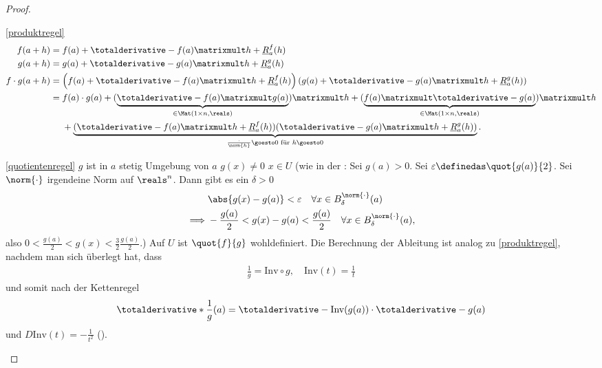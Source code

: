 \begin{proof}
    \begin{proofdescription}
        \item[\ref{produktregel}]
        \begin{align*}
            f(a+h)&=f(a)+\totalderivative-{f}(a)\matrixmult h+\underline{R}_{a}^f(h)\\
            g(a+h)&=g(a)+\totalderivative-{g}(a)\matrixmult h+\underline{R}_{a}^g(h)\\
            f\cdot g(a+h)&\begin{aligned}[t]
                &=\left( f(a)+\totalderivative-{f}(a)\matrixmult h+\underline{R}_{a}^f(h) \right)\left( g(a)+\totalderivative-{g}(a)\matrixmult h+\underline{R}_{a}^g(h) \right)\\
                &=\begin{aligned}[t]
                    &f(a)\cdot g(a)+(\underbrace{\totalderivative-{f}(a)\matrixmult g(a)}_{\in \Mat(1\times n,\reals)})\matrixmult h+(\underbrace{f(a)\matrixmult \totalderivative-{g}(a)}_{\in \Mat(1\times n,\reals)})\matrixmult h\\
                    &+\underbrace{(\totalderivative-{f}(a)\matrixmult h+\underline{R}_a^f(h))(\totalderivative-{g}(a)\matrixmult h+\underline{R}_a^g(h))}_{\frac{\cdot}{\norm{h}}\goesto 0 \text{ für }h\goesto 0}.
                \end{aligned}
            \end{aligned}            
        \end{align*}
        \item[\ref{quotientenregel}] \( g \) ist in \( a \) stetig \timplies \texists Umgebung von \( a \) \sd \( g(x)\neq 0 \) \tforall \( x\in U \) (wie in der : Sei \obda \( g(a)>0 \). Sei \( \varepsilon\definedas \quot{g(a)}{2} \). Sei \( \norm{\cdot} \) irgendeine Norm auf \( \reals^n \). Dann gibt es ein \( \delta>0 \) \sd
        \begin{align*}
            &\abs{g(x)-g(a)}<\varepsilon\quad \forall x\in B_{\delta}^{\norm{\cdot}}(a)\\
            \implies &-\frac{g(a)}{2}<g(x)-g(a)<\frac{g(a)}{2}\quad \forall x\in B_{\delta}^{\norm{\cdot}}(a),
        \end{align*}
        also \( 0<\frac{g(a)}{2}<g(x)<\frac{3}{2}\frac{g(a)}{2} \).) \timplies Auf \( U \) ist \( \quot{f}{g} \) wohldefiniert. Die Berechnung der Ableitung ist analog zu \ref{produktregel}, nachdem man sich überlegt hat, dass
        \begin{align*}
            \frac{1}{g}=\text{Inv}\circ g,\quad \text{Inv}(t)=\frac{1}{t}
        \end{align*}
        und somit nach der Kettenregel
        \begin{align*}
            \totalderivative*{\frac{1}{g}}(a)=\totalderivative-{\text{Inv}(g(a))}\cdot \totalderivative-{g}(a)
        \end{align*}
        und \( D \text{Inv}(t)=-\frac{1}{t^2} \) ().
    \end{proofdescription}    
\end{proof}
